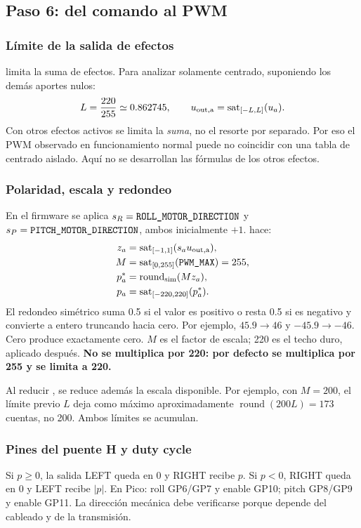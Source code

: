 \subsection{Paso 6: del comando al PWM}
\subsubsection{Límite de la salida de efectos}
 limita la suma de efectos. Para analizar solamente centrado, suponiendo los demás aportes nulos:
\begin{equation}
L=\frac{220}{255}\simeq0.862745,\qquad
u_{\rm out,a}=\operatorname{sat}_{[-L,L]}(u_a).
\end{equation}
Con otros efectos activos se limita la \emph{suma}, no el resorte por separado. Por eso el PWM observado en funcionamiento normal puede no coincidir con una tabla de centrado aislado. Aquí no se desarrollan las fórmulas de los otros efectos.

\subsubsection{Polaridad, escala y redondeo}
En el firmware se aplica $s_R=\code{ROLL_MOTOR_DIRECTION}$ y $s_P=\code{PITCH_MOTOR_DIRECTION}$, ambos inicialmente $+1$.  hace:
\begin{align}
z_a&=\sat_{[-1,1]}(s_a u_{\rm out,a}),\\
M&=\sat_{[0,255]}(\code{PWM_MAX})=255,\\
p_a^*&=\operatorname{round}_{\rm sim}(Mz_a),\\
p_a&=\sat_{[-220,220]}(p_a^*).
\label{eq:pwm}
\end{align}
El redondeo simétrico suma 0.5 si el valor es positivo o resta 0.5 si es negativo y convierte a entero truncando hacia cero. Por ejemplo, $45.9\to46$ y $-45.9\to-46$. Cero produce exactamente cero. $M$ es el factor de escala; 220 es el techo duro, aplicado después. \textbf{No se multiplica por 220: por defecto se multiplica por 255 y se limita a 220.}

Al reducir , se reduce además la escala disponible. Por ejemplo, con $M=200$, el límite previo $L$ deja como máximo aproximadamente $\operatorname{round}(200L)=173$ cuentas, no 200. Ambos límites se acumulan.

\subsubsection{Pines del puente H y duty cycle}
Si $p\ge0$, la salida LEFT queda en 0 y RIGHT recibe $p$. Si $p<0$, RIGHT queda en 0 y LEFT recibe $|p|$. En Pico: roll GP6/GP7 y enable GP10; pitch GP8/GP9 y enable GP11. La dirección mecánica debe verificarse porque depende del cableado y de la transmisión.

